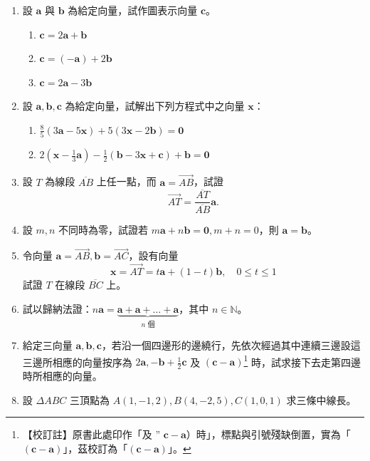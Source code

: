 \begin{enumerate}[label=\arabic*., leftmargin=2em]
  \item 設 $\mathbf{a}$ 與 $\mathbf{b}$ 為給定向量，試作圖表示向量 $\mathbf{c}$。
  \begin{enumerate}[label=(\roman*), leftmargin=2em]
    \item $\mathbf{c} = 2\mathbf{a} + \mathbf{b}$
    \item $\mathbf{c} = (-\mathbf{a}) + 2\mathbf{b}$
    \item $\mathbf{c} = 2\mathbf{a} - 3\mathbf{b}$
  \end{enumerate}
  \item 設 $\mathbf{a}, \mathbf{b}, \mathbf{c}$ 為給定向量，試解出下列方程式中之向量 $\mathbf{x}$：
  \begin{enumerate}[label=(\roman*), leftmargin=2em]
    \item $\frac{8}{5}(3\mathbf{a} - 5\mathbf{x}) + 5(3\mathbf{x} - 2\mathbf{b}) = \mathbf{0}$
    \item $2\left(\mathbf{x} - \frac{1}{3}\mathbf{a}\right) - \frac{1}{2}(\mathbf{b} - 3\mathbf{x} + \mathbf{c}) + \mathbf{b} = \mathbf{0}$
  \end{enumerate}
  \item 設 $T$ 為線段 $\overline{AB}$ 上任一點，而 $\mathbf{a} = \vec{AB}$，試證
  \[ \vec{AT} = \frac{\overline{AT}}{\overline{AB}}\mathbf{a}. \]
  \item 設 $m, n$ 不同時為零，試證若 $m\mathbf{a} + n\mathbf{b} = \mathbf{0}, m + n = 0$，則 $\mathbf{a} = \mathbf{b}$。
  \item 令向量 $\mathbf{a} = \vec{AB}, \mathbf{b} = \vec{AC}$，設有向量
  \[ \mathbf{x} = \vec{AT} = t\mathbf{a} + (1 - t)\mathbf{b}, \quad 0 \le t \le 1 \]
  試證 $T$ 在線段 $\overline{BC}$ 上。
  \item 試以歸納法證：$n\mathbf{a} = \underbrace{\mathbf{a} + \mathbf{a} + \dots + \mathbf{a}}_{n\text{ 個}}$，其中 $n \in \mathbb{N}$。
  \item {}\label{note:b3-ch3-p104-prob7-typo}%
  給定三向量 $\mathbf{a}, \mathbf{b}, \mathbf{c}$，若沿一個四邊形的邊繞行，先依次經過其中連續三邊設這三邊所相應的向量按序為 $2\mathbf{a}, -\mathbf{b} + \frac{1}{2}\mathbf{c}$ 及 $(\mathbf{c} - \mathbf{a})$\footnote{【校訂註】原書此處印作「及 $\text{'' }\mathbf{c}-\mathbf{a}$）時」，標點與引號殘缺倒置，實為「$(\mathbf{c}-\mathbf{a})$」，茲校訂為「$(\mathbf{c}-\mathbf{a})$」。} 時，試求接下去走第四邊時所相應的向量。
  \item 設 $\Delta ABC$ 三頂點為 $A(1, -1, 2), B(4, -2, 5), C(1, 0, 1)$ 求三條中線長。

\end{enumerate}

